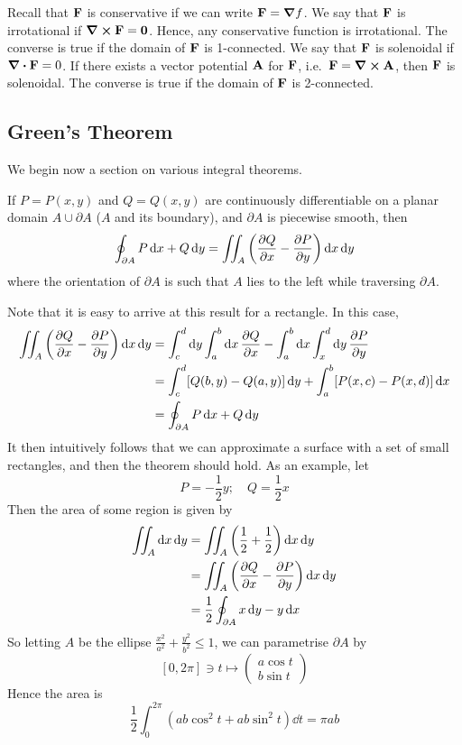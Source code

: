Recall that \(\vb F\) is conservative if we can write \(\vb F = \grad f\).
We say that \(\vb F\) is irrotational if \(\curl{\vb F} = \vb 0\).
Hence, any conservative function is irrotational.
The converse is true if the domain of \(\vb F\) is 1-connected.
We say that \(\vb F\) is solenoidal if \(\div{\vb F} = 0\).
If there exists a vector potential \(\vb A\) for \(\vb F\), i.e.\ \(\vb F = \curl{\vb A}\), then \(\vb F\) is solenoidal.
The converse is true if the domain of \(\vb F\) is 2-connected.

\subsection{Green's Theorem}
We begin now a section on various integral theorems.
\begin{proposition}
	If \(P = P(x, y)\) and \(Q = Q(x, y)\) are continuously differentiable on a planar domain \(A \cup \partial A\) (\(A\) and its boundary), and \(\partial A\) is piecewise smooth, then
	\[
		\oint_{\partial A} P \dd{x} + Q \dd{y} = \iint_{A} \left( \pdv{Q}{x} - \pdv{P}{y} \right) \dd{x}\dd{y}
	\]
	where the orientation of \(\partial A\) is such that \(A\) lies to the left while traversing \(\partial A\).
\end{proposition}
\noindent Note that it is easy to arrive at this result for a rectangle.
In this case,
\begin{align*}
	\iint_{A} \left( \pdv{Q}{x} - \pdv{P}{y} \right) \dd{x}\dd{y} & = \int_c^d \dd{y} \int_a^b \dd{x} \pdv{Q}{x} - \int_a^b \dd{x} \int_x^d \dd{y} \pdv{P}{y} \\
	                                                              & = \int_c^d [Q(b, y) - Q(a, y)] \dd{y} + \int_a^b [P(x, c) - P(x, d)] \dd{x}               \\
	                                                              & = \oint_{\partial A} P \dd{x} + Q \dd{y}
\end{align*}
It then intuitively follows that we can approximate a surface with a set of small rectangles, and then the theorem should hold.
As an example, let
\[
	P = -\frac{1}{2}y;\quad Q = \frac{1}{2}x
\]
Then the area of some region is given by
\begin{align*}
	\iint_A \dd{x}\dd{y} & = \iint_A \left( \frac{1}{2} + \frac{1}{2} \right) \dd{x}\dd{y} \\
	                     & = \iint_A \left( \pdv{Q}{x} - \pdv{P}{y} \right) \dd{x}\dd{y}   \\
	                     & = \frac{1}{2}\oint_{\partial A} x\dd{y} - y\dd{x}
\end{align*}
So letting \(A\) be the ellipse \(\frac{x^2}{a^2} + \frac{y^2}{b^2} \leq 1\), we can parametrise \(\partial A\) by
\[
	[0, 2 \pi] \ni t \mapsto \begin{pmatrix}
		a \cos t \\ b \sin t
	\end{pmatrix}
\]
Hence the area is
\[
	\frac{1}{2}\int_0^{2\pi} \left( ab\cos^2 t + ab\sin^2 t \right) \dd{t} = \pi ab
\]
